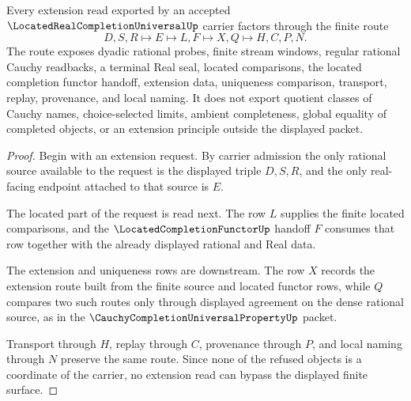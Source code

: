 \begin{theorem}
\label{thm:located-real-completion-universal-extension-route}
Every extension read exported by an accepted $\LocatedRealCompletionUniversalUp$ carrier factors through the finite route
$$
D,S,R \longmapsto E \longmapsto L,F \longmapsto X,Q \longmapsto H,C,P,N.
$$
The route exposes dyadic rational probes, finite stream windows, regular rational Cauchy readbacks, a terminal Real seal, located comparisons, the located completion functor handoff, extension data, uniqueness comparison, transport, replay, provenance, and local naming. It does not export quotient classes of Cauchy names, choice-selected limits, ambient completeness, global equality of completed objects, or an extension principle outside the displayed packet.
\end{theorem}
\begin{proof}
Begin with an extension request. By carrier admission the only rational source available to the request is the displayed triple $D,S,R$, and the only real-facing endpoint attached to that source is $E$.

The located part of the request is read next. The row $L$ supplies the finite located comparisons, and the $\LocatedCompletionFunctorUp$ handoff $F$ consumes that row together with the already displayed rational and Real data.

The extension and uniqueness rows are downstream. The row $X$ records the extension route built from the finite source and located functor rows, while $Q$ compares two such routes only through displayed agreement on the dense rational source, as in the $\CauchyCompletionUniversalPropertyUp$ packet.

Transport through $H$, replay through $C$, provenance through $P$, and local naming through $N$ preserve the same route. Since none of the refused objects is a coordinate of the carrier, no extension read can bypass the displayed finite surface.
\end{proof}


